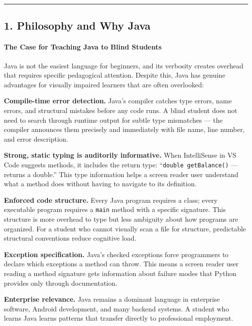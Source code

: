 \documentclass[
  justified,
  openright,
]{tufte-book}
\let\subsubsection\paragraph
\let\paragraph\paragraph
\let\subsubsection\paragraph
\let\paragraph\paragraph
\begin{document}
\begin{center}\rule{0.5\linewidth}{0.5pt}\end{center}

\subsection{1. Philosophy and Why Java}\label{philosophy-and-why-java}

\subsubsection{The Case for Teaching Java to Blind
Students}\label{the-case-for-teaching-java-to-blind-students}

Java is not the easiest language for beginners, and its verbosity
creates overhead that requires specific pedagogical attention. Despite
this, Java has genuine advantages for visually impaired learners that
are often overlooked:

\textbf{Compile-time error detection.} Java's compiler catches type
errors, name errors, and structural mistakes before any code runs. A
blind student does not need to search through runtime output for subtle
type mismatches --- the compiler announces them precisely and
immediately with file name, line number, and error description.

\textbf{Strong, static typing is auditorily informative.} When
IntelliSense in VS Code suggests methods, it includes the return type:
``\texttt{double\ getBalance()} --- returns a double.'' This type
information helps a screen reader user understand what a method does
without having to navigate to its definition.

\textbf{Enforced code structure.} Every Java program requires a class;
every executable program requires a \texttt{main} method with a specific
signature. This structure is more overhead to type but less ambiguity
about how programs are organized. For a student who cannot visually scan
a file for structure, predictable structural conventions reduce
cognitive load.

\textbf{Exception specification.} Java's checked exceptions force
programmers to declare which exceptions a method can throw. This means a
screen reader user reading a method signature gets information about
failure modes that Python provides only through documentation.

\textbf{Enterprise relevance.} Java remains a dominant language in
enterprise software, Android development, and many backend systems. A
student who learns Java learns patterns that transfer directly to
professional employment.
\end{document}
